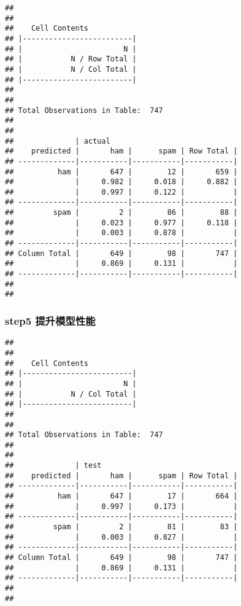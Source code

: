 \documentclass[]{article}
\newenvironment{Shaded}{\begin{snugshade}}{\end{snugshade}}
\newcommand{\KeywordTok}[1]{\textcolor[rgb]{0.13,0.29,0.53}{\textbf{#1}}}
\newcommand{\DataTypeTok}[1]{\textcolor[rgb]{0.13,0.29,0.53}{#1}}
\newcommand{\DecValTok}[1]{\textcolor[rgb]{0.00,0.00,0.81}{#1}}
\newcommand{\StringTok}[1]{\textcolor[rgb]{0.31,0.60,0.02}{#1}}
\newcommand{\OperatorTok}[1]{\textcolor[rgb]{0.81,0.36,0.00}{\textbf{#1}}}
\newcommand{\NormalTok}[1]{#1}
\begin{document}
\begin{verbatim}
## 
##  
##    Cell Contents
## |-------------------------|
## |                       N |
## |           N / Row Total |
## |           N / Col Total |
## |-------------------------|
## 
##  
## Total Observations in Table:  747 
## 
##  
##              | actual 
##    predicted |       ham |      spam | Row Total | 
## -------------|-----------|-----------|-----------|
##          ham |       647 |        12 |       659 | 
##              |     0.982 |     0.018 |     0.882 | 
##              |     0.997 |     0.122 |           | 
## -------------|-----------|-----------|-----------|
##         spam |         2 |        86 |        88 | 
##              |     0.023 |     0.977 |     0.118 | 
##              |     0.003 |     0.878 |           | 
## -------------|-----------|-----------|-----------|
## Column Total |       649 |        98 |       747 | 
##              |     0.869 |     0.131 |           | 
## -------------|-----------|-----------|-----------|
## 
## 
\end{verbatim}

\subsubsection{step5 提升模型性能}\label{step5-}

\begin{Shaded}
\end{Shaded}

\begin{verbatim}
## 
##  
##    Cell Contents
## |-------------------------|
## |                       N |
## |           N / Col Total |
## |-------------------------|
## 
##  
## Total Observations in Table:  747 
## 
##  
##              | test 
##    predicted |       ham |      spam | Row Total | 
## -------------|-----------|-----------|-----------|
##          ham |       647 |        17 |       664 | 
##              |     0.997 |     0.173 |           | 
## -------------|-----------|-----------|-----------|
##         spam |         2 |        81 |        83 | 
##              |     0.003 |     0.827 |           | 
## -------------|-----------|-----------|-----------|
## Column Total |       649 |        98 |       747 | 
##              |     0.869 |     0.131 |           | 
## -------------|-----------|-----------|-----------|
## 
## 
\end{verbatim}
\end{document}
